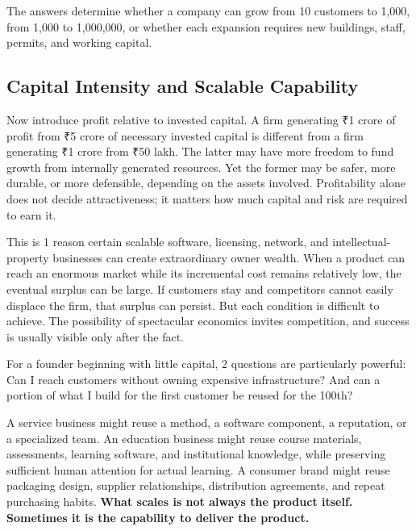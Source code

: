The answers determine whether a company can grow from 10 customers to 1,000, from 1,000 to 1,000,000, or whether each expansion requires new buildings, staff, permits, and working capital.

\subsection{Capital Intensity and Scalable Capability}

Now introduce profit relative to invested capital. A firm generating ₹1 crore of profit from ₹5 crore of necessary invested capital is different from a firm generating ₹1 crore from ₹50 lakh. The latter may have more freedom to fund growth from internally generated resources. Yet the former may be safer, more durable, or more defensible, depending on the assets involved. Profitability alone does not decide attractiveness; it matters how much capital and risk are required to earn it.

This is 1 reason certain scalable software, licensing, network, and intellectual-property businesses can create extraordinary owner wealth. When a product can reach an enormous market while its incremental cost remains relatively low, the eventual surplus can be large. If customers stay and competitors cannot easily displace the firm, that surplus can persist. But each condition is difficult to achieve. The possibility of spectacular economics invites competition, and success is usually visible only after the fact.

For a founder beginning with little capital, 2 questions are particularly powerful: Can I reach customers without owning expensive infrastructure? And can a portion of what I build for the first customer be reused for the 100th?

A service business might reuse a method, a software component, a reputation, or a specialized team. An education business might reuse course materials, assessments, learning software, and institutional knowledge, while preserving sufficient human attention for actual learning. A consumer brand might reuse packaging design, supplier relationships, distribution agreements, and repeat purchasing habits. \textbf{What scales is not always the product itself. Sometimes it is the capability to deliver the product.}
